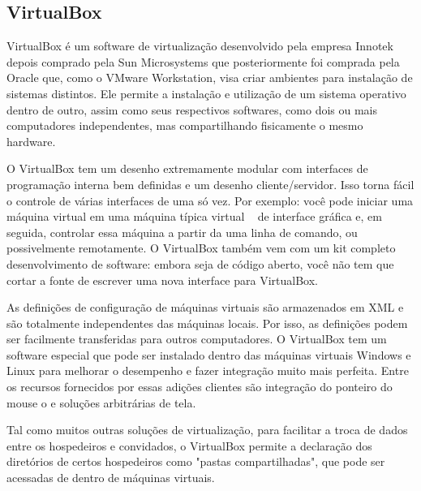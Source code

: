 \subsection{VirtualBox}

VirtualBox é um software de virtualização desenvolvido pela empresa Innotek depois comprado pela Sun Microsystems que posteriormente foi comprada pela Oracle que, como o VMware Workstation, visa criar ambientes para instalação de sistemas distintos. Ele permite a instalação e utilização de um sistema operativo dentro de outro, assim como seus respectivos softwares, como dois ou mais computadores independentes, mas compartilhando fisicamente o mesmo hardware.

O VirtualBox tem um desenho extremamente modular com interfaces de programação interna bem definidas e um desenho cliente/servidor. Isso torna fácil o controle de várias interfaces de uma só vez. Por exemplo: você pode iniciar uma máquina virtual em uma máquina típica virtual ~\cite{stallings} de interface gráfica e, em seguida, controlar essa máquina a partir da uma linha de comando, ou possivelmente remotamente. O VirtualBox também vem com um kit completo desenvolvimento de software: embora seja de código aberto, você não tem que cortar a fonte de escrever uma nova interface para VirtualBox.

As definições de configuração de máquinas virtuais são armazenados em XML e são totalmente independentes das máquinas locais. Por isso, as definições podem ser facilmente transferidas para outros computadores.
O VirtualBox tem um software especial que pode ser instalado dentro das máquinas virtuais Windows e Linux para melhorar o desempenho e fazer integração muito mais perfeita. Entre os recursos fornecidos por essas adições clientes são integração do ponteiro do mouse o e soluções arbitrárias de tela.

Tal como muitos outras soluções de virtualização, para facilitar a troca de dados entre os hospedeiros e convidados, o VirtualBox permite a declaração dos diretórios de certos hospedeiros como "pastas compartilhadas", que pode ser acessadas de dentro de máquinas virtuais.


